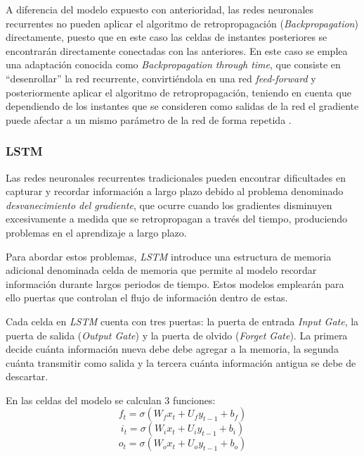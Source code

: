 A diferencia del modelo expuesto con anterioridad, las redes neuronales recurrentes no pueden aplicar el algoritmo de retropropagación (\textit{Backpropagation})
directamente, puesto que en este caso las celdas de instantes posteriores se encontrarán directamente conectadas con las anteriores.
En este caso se emplea una adaptación conocida como \textit{Backpropagation through time}, que consiste en ``desenrollar'' la red recurrente, convirtiéndola
en una red \textit{feed-forward} y posteriormente aplicar el algoritmo de retropropagación, teniendo en cuenta que dependiendo de los instantes 
que se consideren como salidas de la red el gradiente puede afectar a un mismo parámetro de la red de forma repetida \cite{book:rue2019}.

\subsubsection{LSTM}
Las redes neuronales recurrentes tradicionales pueden encontrar dificultades en capturar y recordar información
a largo plazo debido al problema denominado \textit{desvanecimiento del gradiente}, que ocurre
cuando los gradientes disminuyen excesivamente a medida que se retropropagan a través
del tiempo, produciendo problemas en el aprendizaje a largo plazo.

Para abordar estos problemas, \textit{LSTM} introduce una estructura de memoria adicional denominada
celda de memoria que permite al modelo recordar información durante largos periodos de tiempo. Estos 
modelos emplearán para ello puertas que controlan el flujo de información dentro de estas.

Cada celda en \textit{LSTM} cuenta con tres puertas: la puerta de entrada \textit{Input Gate}, la puerta de salida 
(\textit{Output Gate}) y la puerta de olvido (\textit{Forget Gate}). La primera decide
cuánta información nueva debe debe agregar a la memoria, la segunda cuánta transmitir como salida y 
la tercera cuánta información antigua se debe de descartar.

En las celdas del modelo se calculan 3 funciones:
\begin{equation}
    f_t = \sigma (W_{f} x_t + U_{f} y_{t-1} + b_f)
\end{equation}
\begin{equation}
    i_t = \sigma (W_{i} x_t + U_{i} y_{t-1} + b_i)
\end{equation}
\begin{equation}    
    o_t = \sigma (W_{o} x_t + U_{o} y_{t-1} + b_o)
\end{equation}

